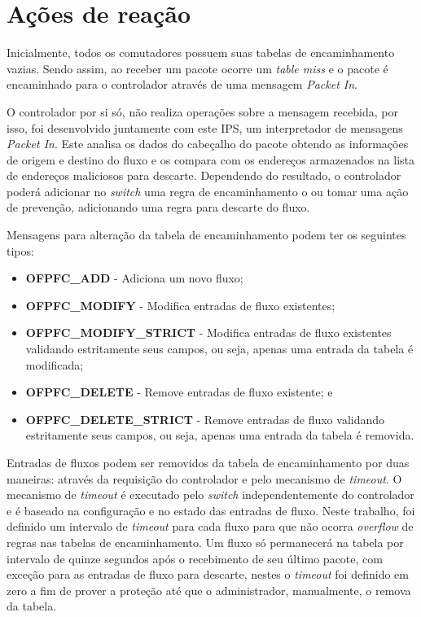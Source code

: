 \section{Ações de reação}
\label{sec:reacao}

Inicialmente, todos os comutadores possuem suas tabelas de encaminhamento vazias. Sendo assim, ao receber um pacote ocorre um \textit{table miss} e o pacote é encaminhado para o controlador através de uma mensagem \textit{Packet In}.

O controlador por si só, não realiza operações sobre a mensagem recebida, por isso, foi desenvolvido juntamente com este IPS, um interpretador de mensagens \textit{Packet In}. Este analisa os dados do cabeçalho do pacote obtendo as informações de origem e destino do fluxo e os compara com os endereços armazenados na lista de endereços maliciosos para descarte. Dependendo do resultado, o controlador poderá adicionar no \textit{switch} uma regra de encaminhamento o ou tomar uma ação de prevenção, adicionando uma regra para descarte do fluxo.

Mensagens para alteração da tabela de encaminhamento podem ter os seguintes tipos:
\begin{itemize}
    \item \textbf{OFPFC\_ADD} - Adiciona um novo fluxo;
    \item \textbf{OFPFC\_MODIFY} - Modifica entradas de fluxo existentes;
    \item \textbf{OFPFC\_MODIFY\_STRICT} - Modifica entradas de fluxo existentes validando estritamente seus campos, ou seja, apenas uma entrada da tabela é modificada;
    \item \textbf{OFPFC\_DELETE} - Remove entradas de fluxo existente; e
    \item \textbf{OFPFC\_DELETE\_STRICT} - Remove entradas de fluxo validando estritamente seus campos, ou seja, apenas uma entrada da tabela é removida.
\end{itemize}

Entradas de fluxos podem ser removidos da tabela de encaminhamento por duas maneiras: através da requisição do controlador e pelo mecanismo de \textit{timeout}. O mecanismo de \textit{timeout} é executado pelo \textit{switch} independentemente do controlador e é baseado na configuração e no estado das entradas de fluxo. Neste trabalho, foi definido um intervalo de \textit{timeout} para cada fluxo para que não ocorra \textit{overflow} de regras nas tabelas de encaminhamento. Um fluxo só permanecerá na tabela por intervalo de quinze segundos após o recebimento de seu último pacote, com exceção para as entradas de fluxo para descarte, nestes o \textit{timeout} foi definido em zero a fim de prover a proteção até que o administrador, manualmente, o remova da tabela.

